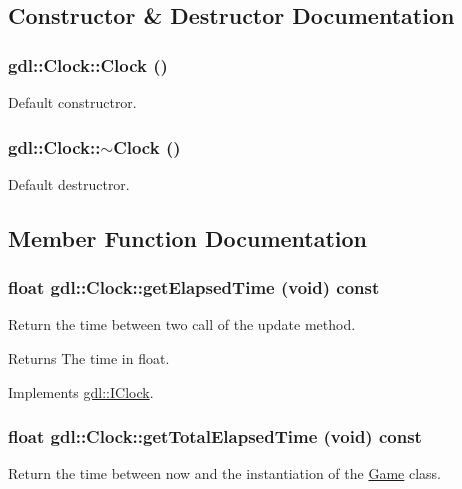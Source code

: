 \subsection{Constructor \& Destructor Documentation}
\hypertarget{classgdl_1_1Clock_aab3b54f0e335efd7136e8a2900da9c3e}{
\subsubsection[{Clock}]{\setlength{\rightskip}{0pt plus 5cm}gdl::Clock::Clock ()}}
\label{classgdl_1_1Clock_aab3b54f0e335efd7136e8a2900da9c3e}
Default constructror. \hypertarget{classgdl_1_1Clock_a54c8e0862b5903056d169195c0b22072}{
\subsubsection[{$\sim$Clock}]{\setlength{\rightskip}{0pt plus 5cm}gdl::Clock::$\sim$Clock ()}}
\label{classgdl_1_1Clock_a54c8e0862b5903056d169195c0b22072}
Default destructror. 

\subsection{Member Function Documentation}
\hypertarget{classgdl_1_1Clock_a3b81a05f6b9d4af46b6c955017c8ddfd}{
\subsubsection[{getElapsedTime}]{\setlength{\rightskip}{0pt plus 5cm}float gdl::Clock::getElapsedTime (void) const}}
\label{classgdl_1_1Clock_a3b81a05f6b9d4af46b6c955017c8ddfd}
Return the time between two call of the update method.

\begin{DoxyReturn}{Returns}
The time in float. 
\end{DoxyReturn}


Implements \hyperlink{classgdl_1_1IClock_ad5c3e51562a10e319a3494785d077d1b}{gdl::IClock}.\hypertarget{classgdl_1_1Clock_a1c7cb8d2c1c742db97cb667c2cfe5552}{
\subsubsection[{getTotalElapsedTime}]{\setlength{\rightskip}{0pt plus 5cm}float gdl::Clock::getTotalElapsedTime (void) const}}
\label{classgdl_1_1Clock_a1c7cb8d2c1c742db97cb667c2cfe5552}
Return the time between now and the instantiation of the \hyperlink{classgdl_1_1Game}{Game} class.


